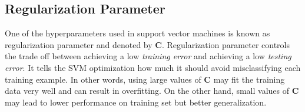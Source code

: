 \subsection{Regularization Parameter} \label{subsec:RegPar}

One of the hyperparameters used in support vector machines is known as regularization parameter and denoted by $\mathbf{C}$. Regularization parameter controls the trade off between achieving a low \textit{training error} and achieving a low \textit{testing error}. It tells the SVM optimization how much it should avoid misclassifying each training example. In other words, using large values of $\mathbf{C}$ may fit the training data very well and can result in overfitting. On the other hand, small values of $\mathbf{C}$ may lead to lower performance on training set but better generalization.
